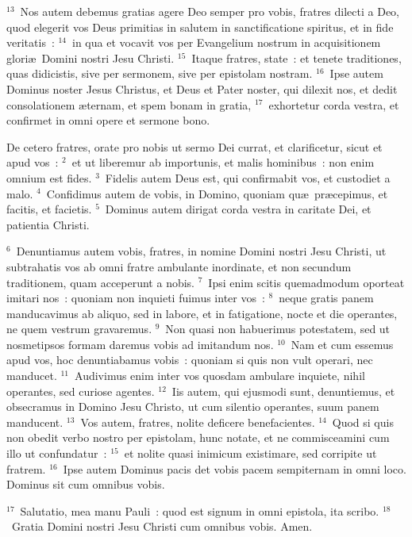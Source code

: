 ${}^{13}$~Nos autem debemus gratias agere Deo semper pro vobis, fratres dilecti a Deo, quod elegerit vos Deus primitias in salutem in sanctificatione spiritus, et in fide veritatis~:
${}^{14}$~in qua et vocavit vos per Evangelium nostrum in acquisitionem glori\ae\ Domini nostri Jesu Christi.
${}^{15}$~Itaque fratres, state~: et tenete traditiones, quas didicistis, sive per sermonem, sive per epistolam nostram.
${}^{16}$~Ipse autem Dominus noster Jesus Christus, et Deus et Pater noster, qui dilexit nos, et dedit consolationem \ae ternam, et spem bonam in gratia,
${}^{17}$~exhortetur corda vestra, et confirmet in omni opere et sermone bono.

\lettrine[lines=3,image=true,loversize=0.05,lraise=-0.03]{D}{}e cetero fratres, orate pro nobis ut sermo Dei currat, et clarificetur, sicut et apud vos~:
${}^{2}$~et ut liberemur ab importunis, et malis hominibus~: non enim omnium est fides.
${}^{3}$~Fidelis autem Deus est, qui confirmabit vos, et custodiet a malo.
${}^{4}$~Confidimus autem de vobis, in Domino, quoniam qu\ae\ pr\ae cepimus, et facitis, et facietis.
${}^{5}$~Dominus autem dirigat corda vestra in caritate Dei, et patientia Christi.


${}^{6}$~Denuntiamus autem vobis, fratres, in nomine Domini nostri Jesu Christi, ut subtrahatis vos ab omni fratre ambulante inordinate, et non secundum traditionem, quam acceperunt a nobis.
${}^{7}$~Ipsi enim scitis quemadmodum oporteat imitari nos~: quoniam non inquieti fuimus inter vos~:
${}^{8}$~neque gratis panem manducavimus ab aliquo, sed in labore, et in fatigatione, nocte et die operantes, ne quem vestrum gravaremus.
${}^{9}$~Non quasi non habuerimus potestatem, sed ut nosmetipsos formam daremus vobis ad imitandum nos.
${}^{10}$~Nam et cum essemus apud vos, hoc denuntiabamus vobis~: quoniam si quis non vult operari, nec manducet.
${}^{11}$~Audivimus enim inter vos quosdam ambulare inquiete, nihil operantes, sed curiose agentes.
${}^{12}$~Iis autem, qui ejusmodi sunt, denuntiemus, et obsecramus in Domino Jesu Christo, ut cum silentio operantes, suum panem manducent.
${}^{13}$~Vos autem, fratres, nolite deficere benefacientes.
${}^{14}$~Quod si quis non obedit verbo nostro per epistolam, hunc notate, et ne commisceamini cum illo ut confundatur~:
${}^{15}$~et nolite quasi inimicum existimare, sed corripite ut fratrem.
${}^{16}$~Ipse autem Dominus pacis det vobis pacem sempiternam in omni loco. Dominus sit cum omnibus vobis.


${}^{17}$~Salutatio, mea manu Pauli~: quod est signum in omni epistola, ita scribo.
${}^{18}$~Gratia Domini nostri Jesu Christi cum omnibus vobis. Amen.

